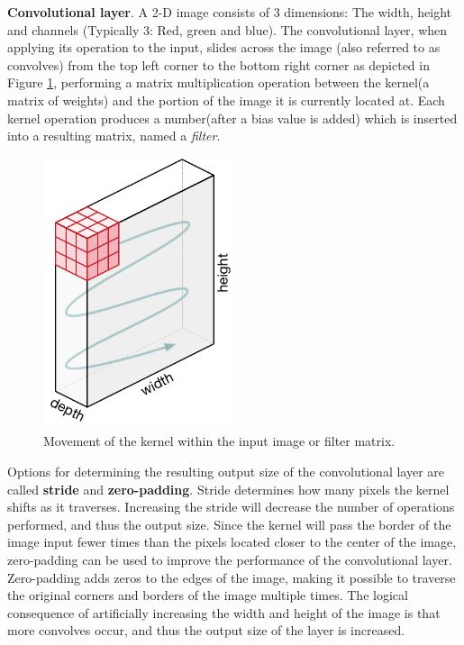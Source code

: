 \documentclass[english, bibtex]{kththesis}
\begin{document}
\textbf{Convolutional layer}. A 2-D image consists of 3 dimensions: The width, height and channels (Typically 3: Red, green and blue). The convolutional layer, when applying its operation to the input, slides across the image (also referred to as convolves) from the top left corner to the bottom right corner as depicted in Figure \ref{fig:kernelmovement}, performing a matrix multiplication operation between the kernel(a matrix of weights) and the portion of the image it is currently located at. Each kernel operation produces a number(after a bias value is added) which is inserted into a resulting matrix, named a \textit{filter}.

\begin{figure}[H]
  \begin{center}
    \includegraphics[width=0.5\textwidth]{figures/kernel_movement.png}
  \end{center}
  \caption{Movement of the kernel within the input image or filter matrix\cite{Kang2020DeepCN}.}
  \label{fig:kernelmovement}
\end{figure}


Options for determining the resulting output size of the convolutional layer are called \textbf{stride} and \textbf{zero-padding}. Stride determines how many pixels the kernel shifts as it traverses. Increasing the stride will decrease the number of operations performed, and thus the output size. Since the kernel will pass the border of the image input fewer times than the pixels located closer to the center of the image, zero-padding can be used to improve the performance of the convolutional layer. Zero-padding adds zeros to the edges of the image, making it possible to traverse the original corners and borders of the image multiple times. The logical consequence of artificially increasing the width and height of the image is that more convolves occur, and thus the output size of the layer is increased. 
\end{document}
